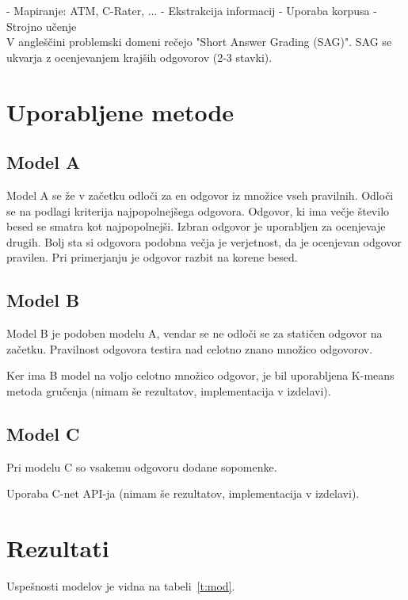 \documentclass[journal]{IEEEtran}
\begin{document}
- Mapiranje: ATM, C-Rater, ...
- Ekstrakcija informacij
- Uporaba korpusa
- Strojno učenje\\

V angleščini problemski domeni rečejo "Short Answer Grading (SAG)". SAG se ukvarja z ocenjevanjem krajših odgovorov (2-3 stavki).


\section{Uporabljene metode}
\subsection{Model A}
Model A se že v začetku odloči za en odgovor iz množice vseh pravilnih. Odloči se na podlagi kriterija najpopolnejšega odgovora. Odgovor, ki ima večje število besed se smatra kot najpopolnejši.
Izbran odgovor je uporabljen za ocenjevaje drugih. Bolj sta si odgovora podobna večja je verjetnost, da je ocenjevan odgovor pravilen. Pri primerjanju je odgovor razbit na korene besed.

\subsection{Model B}
Model B je podoben modelu A, vendar se ne odloči se za statičen odgovor na začetku. Pravilnost odgovora testira nad celotno znano množico odgovorov.

Ker ima B model na voljo celotno množico odgovor, je bil uporabljena K-means metoda gručenja (nimam še rezultatov, implementacija v izdelavi).


\subsection{Model C}
Pri modelu C so vsakemu odgovoru dodane sopomenke. 

Uporaba C-net API-ja (nimam še rezultatov, implementacija v izdelavi).

\section{Rezultati}
Uspešnosti modelov je vidna na tabeli~\ref{t:mod}.
\end{document}
